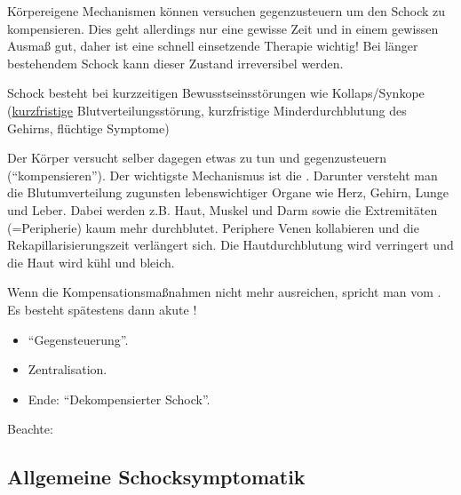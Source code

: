 
Körpereigene Mechanismen können versuchen gegenzusteuern
um den Schock zu kompensieren. Dies geht allerdings nur eine
gewisse Zeit und in einem gewissen Ausmaß gut, daher ist eine
schnell  einsetzende Therapie wichtig! Bei länger bestehendem Schock
kann dieser Zustand irreversibel werden. 

 Schock besteht bei kurzzeitigen 
Bewusstseinsstörungen wie Kollaps/Synkope
(\underline{kurzfristige} Blutverteilungsstörung,
kurzfristige Minderdurchblutung des Gehirns,  flüchtige Symptome)

{
Der Körper versucht selber dagegen etwas zu tun und gegenzusteuern
("`kompensieren"'). Der
wichtigste Mechanismus ist die
. Darunter versteht
man die Blutumverteilung zugunsten lebenswichtiger Organe wie
Herz, Gehirn, Lunge und Leber. Dabei werden z.B. Haut, Muskel
und Darm
sowie die Extremitäten (=Peripherie) kaum mehr  durchblutet.
Periphere Venen kollabieren und die Rekapillarisierungszeit
verlängert sich. Die Hautdurchblutung wird verringert und
die Haut wird kühl und bleich.

Wenn die Kompensationsmaßnahmen 
nicht mehr ausreichen, spricht man vom . Es besteht
spätestens dann akute !
}{
\begin{itemize}
    \item "`Gegensteuerung"'.
    \item Zentralisation.
    \item Ende: "`Dekompensierter Schock"'.
\end{itemize}
}{}{}{}



Beachte: 



\subsection{Allgemeine Schocksymptomatik}
\label{topic:schock-allgemeine-symptomatik}

